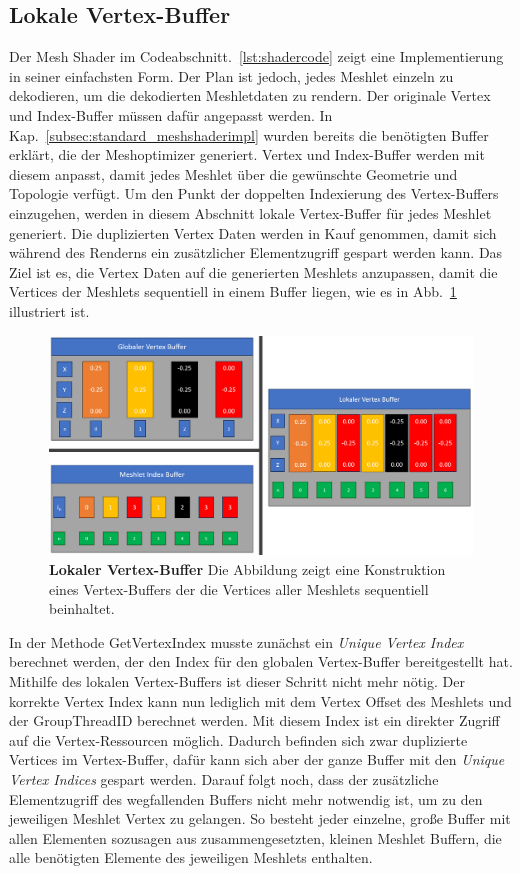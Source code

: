 \subsection{Lokale Vertex-Buffer}
\label{subsec:local_vertex_buffers}
Der Mesh Shader im Codeabschnitt.~\ref{lst:shadercode} zeigt eine Implementierung in seiner einfachsten Form.
Der Plan ist jedoch, jedes Meshlet einzeln zu dekodieren, um die dekodierten Meshletdaten zu rendern.
Der originale Vertex und Index-Buffer müssen dafür angepasst werden.
In Kap.~\ref{subsec:standard_meshshaderimpl} wurden bereits die benötigten Buffer erklärt, die der Meshoptimizer generiert.
Vertex und Index-Buffer werden mit diesem anpasst, damit jedes Meshlet über die gewünschte Geometrie und Topologie verfügt. \newline
Um den Punkt der doppelten Indexierung des Vertex-Buffers einzugehen, werden in diesem Abschnitt lokale Vertex-Buffer für jedes Meshlet generiert.
Die duplizierten Vertex Daten werden in Kauf genommen, damit sich während des Renderns ein zusätzlicher Elementzugriff gespart werden kann.
\newline
Das Ziel ist es, die Vertex Daten auf die generierten Meshlets anzupassen, damit die Vertices der Meshlets sequentiell in einem Buffer liegen, wie es in Abb.~\ref{fig:local_vertex_buffer} illustriert ist.
\begin{figure}[htb]
  \centering  
  \includegraphics[scale=0.375]{Bilder/local_vertex_buffer.png}
  \caption[Lokaler Vertex-Buffer]{\textbf{Lokaler Vertex-Buffer} Die Abbildung zeigt eine Konstruktion eines Vertex-Buffers der die Vertices aller Meshlets sequentiell beinhaltet.}
  \label{fig:local_vertex_buffer}
\end{figure}

In der Methode GetVertexIndex musste zunächst ein \textit{Unique Vertex Index} berechnet werden, der den Index für den globalen Vertex-Buffer bereitgestellt hat.
Mithilfe des lokalen Vertex-Buffers ist dieser Schritt nicht mehr nötig.
Der korrekte Vertex Index kann nun lediglich mit dem Vertex Offset des Meshlets und der GroupThreadID berechnet werden.
Mit diesem Index ist ein direkter Zugriff auf die Vertex-Ressourcen möglich.
Dadurch befinden sich zwar duplizierte Vertices im Vertex-Buffer, dafür kann sich aber der ganze Buffer mit den \textit{Unique Vertex Indices} gespart werden.
Darauf folgt noch, dass der zusätzliche Elementzugriff des wegfallenden Buffers nicht mehr notwendig ist, um zu den jeweiligen Meshlet Vertex zu gelangen.
So besteht jeder einzelne, große Buffer mit allen Elementen sozusagen aus zusammengesetzten, kleinen Meshlet Buffern, die alle benötigten Elemente des jeweiligen Meshlets enthalten.